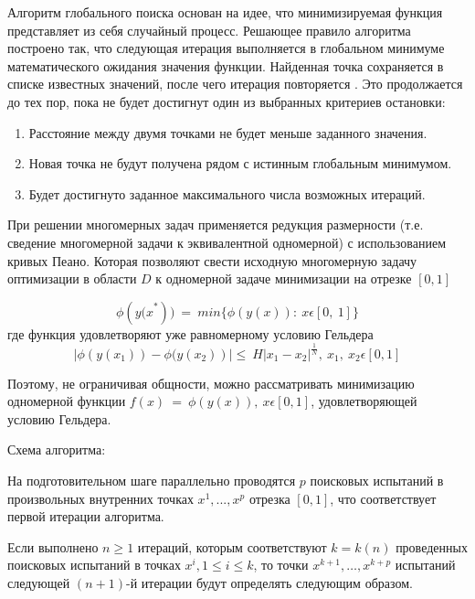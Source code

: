 \documentclass[12pt, a4paper, russian]{article}
\begin{document}
Алгоритм глобального поиска основан на идее, что минимизируемая функция представляет из себя случайный процесс. Решающее правило алгоритма построено так, что следующая итерация выполняется в глобальном минимуме математического ожидания значения функции. Найденная точка сохраняется в списке известных значений, после чего итерация повторяется . Это продолжается до тех пор, пока не будет достигнут один из выбранных критериев остановки: 
\begin{enumerate}
 \item Расстояние между двумя точками не будет меньше заданного значения.
 \item Новая точка не будут получена рядом с истинным глобальным минимумом.
 \item Будет достигнуто заданное максимального числа возможных итераций.
\end{enumerate}

При решении многомерных задач применяется редукция размерности (т.е. сведение многомерной задачи к эквивалентной одномерной) с использованием кривых Пеано. Которая позволяют свести исходную многомерную задачу оптимизации в области $D$  к одномерной задаче минимизации на отрезке $[0, 1]$

\begin{equation*}
\phi({y(x}^\ast))\ =\ min\{\phi(y(x)):\ x\epsilon[0,\ 1]\}
\end{equation*}
где функция  удовлетворяют уже равномерному условию Гельдера
\begin{equation*}
\left|\phi (y \left(x_1\right))- \phi (y \left(x_2\right)\right )|\le\ H\left|x_1-x_2\right|^\frac{1}{N},\ x_1,\ x_2\epsilon[0,1]		
\end{equation*}

Поэтому, не ограничивая общности, можно рассматривать минимизацию одномерной функции $f(x)\ =\ \phi(y(x)), \ x\epsilon [0,1]$, удовлетворяющей условию Гельдера.

Схема алгоритма:

На подготовительном шаге параллельно проводятся $p$ поисковых испытаний в произвольных внутренних точках $x^1, ...,x^p$ отрезка $[0,1]$, что соответствует первой итерации  алгоритма. 

Если выполнено $n\geq1$ итераций, которым соответствуют $k=k(n)$ проведенных поисковых испытаний в точках $x^i, 1\leq i\leq k$, то точки $x^{k+1},\ldots,x^{k+p}$ испытаний следующей $(n+1)$-й итерации будут определять следующим образом.
\end{document}
